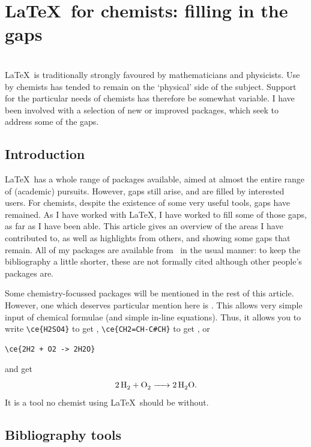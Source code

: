 \section{\LaTeX\ for chemists: filling in the gaps}
\begin{bibunit}
 \\
\LaTeX\ is traditionally strongly favoured by mathematicians
and physicists.  Use by chemists has tended to remain on the
`physical' side of the subject.  Support for the particular
needs of chemists has therefore be somewhat variable.  I have
been involved with a selection of new or improved packages,
which seek to address some of the gaps.

\subsection{Introduction}

\LaTeX\ has a whole range of packages available, aimed at
almost the entire range of (academic) pursuits.  However, gaps
still arise, and are filled by interested users.  For chemists,
despite the existence of some very useful tools, gaps have
remained.  As I have worked with \LaTeX, I have worked to fill
some of those gaps, as far as I have been able.  This article
gives an overview of the areas I have contributed to, as well
as highlights from others, and showing some gaps that remain.
All of my packages are available from \CTAN\ in the usual
manner: to keep the bibliography a little shorter, these are
not formally cited although other people's packages are.

Some chemistry-focussed packages will be mentioned in the rest
of this article.  However, one which deserves particular
mention here is  \cite{Hensel2007}.  This allows
very simple input of chemical formulae (and simple in-line
equations). Thus, it allows you to write \verb|\ce{H2SO4}| to
get , \verb|\ce{CH2=CH-C#CH}| to get
, or
\begin{verbatim}
\ce{2H2 + O2 -> 2H2O}
\end{verbatim}
and get
\begin{equation}
  \ce{2H2 + O2 -> 2H2O}.
\end{equation} 
It is a tool no chemist using \LaTeX\ should be without.

\subsection{Bibliography tools}


\end{bibunit}
